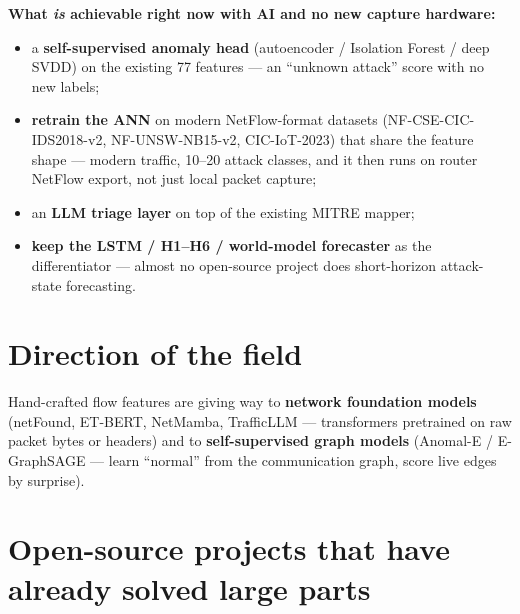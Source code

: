 \documentclass[11pt,a4paper]{article}
\begin{document}
\textbf{What \emph{is} achievable right now with AI and no new capture hardware:}
\begin{itemize}
\item a \textbf{self-supervised anomaly head} (autoencoder / Isolation Forest /
  deep SVDD) on the existing 77 features --- an ``unknown attack'' score with no
  new labels;
\item \textbf{retrain the ANN} on modern NetFlow-format datasets
  (NF-CSE-CIC-IDS2018-v2, NF-UNSW-NB15-v2, CIC-IoT-2023) that share the feature
  shape --- modern traffic, 10--20 attack classes, and it then runs on router
  NetFlow export, not just local packet capture;
\item an \textbf{LLM triage layer} on top of the existing MITRE mapper;
\item \textbf{keep the LSTM / H1--H6 / world-model forecaster} as the
  differentiator --- almost no open-source project does short-horizon attack-state
  forecasting.
\end{itemize}

\section{Direction of the field}
Hand-crafted flow features are giving way to \textbf{network foundation models}
(netFound, ET-BERT, NetMamba, TrafficLLM --- transformers pretrained on raw
packet bytes or headers) and to \textbf{self-supervised graph models}
(Anomal-E / E-GraphSAGE --- learn ``normal'' from the communication graph, score
live edges by surprise).

\section{Open-source projects that have already solved large parts}
\end{document}
